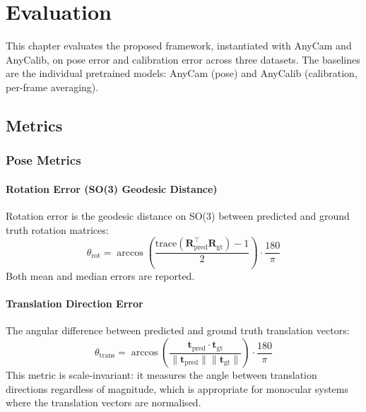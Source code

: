 
\chapter{Evaluation}\label{chapter:evaluation}

This chapter evaluates the proposed framework, instantiated with AnyCam and AnyCalib, on pose error and calibration error across three datasets. The baselines are the individual pretrained models: AnyCam (pose) and AnyCalib (calibration, per-frame averaging).

\section{Metrics}\label{sec:eval-metrics}

\subsection{Pose Metrics}\label{sec:pose-metrics}

\subsubsection{Rotation Error (SO(3) Geodesic Distance)}

Rotation error is the geodesic distance on SO(3) between predicted and ground truth rotation matrices:
\begin{equation}
    \theta_{\text{rot}} = \arccos\left(\frac{\text{trace}(\mathbf{R}_{\text{pred}}^\top \mathbf{R}_{\text{gt}}) - 1}{2}\right) \cdot \frac{180}{\pi}
\end{equation}
Both mean and median errors are reported.

\subsubsection{Translation Direction Error}

The angular difference between predicted and ground truth translation vectors:
\begin{equation}
    \theta_{\text{trans}} = \arccos\left(\frac{\mathbf{t}_{\text{pred}} \cdot \mathbf{t}_{\text{gt}}}{\|\mathbf{t}_{\text{pred}}\| \|\mathbf{t}_{\text{gt}}\|}\right) \cdot \frac{180}{\pi}
\end{equation}
This metric is scale-invariant: it measures the angle between translation directions regardless of magnitude, which is appropriate for monocular systems where the translation vectors are normalised.

